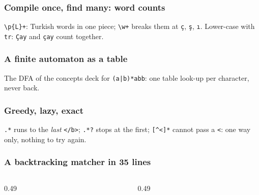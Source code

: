 \documentclass[aspectratio=169,10pt,compress]{beamer}
\begin{document}
\begin{frame}[t,fragile] \frametitle{Compile once, find many: word counts}

  \vspace{0.2em}
  \small \texttt{\textbackslash p\{L\}+}: Turkish words in one piece; \texttt{\textbackslash w+} breaks them at \texttt{ç}, \texttt{ş}, \texttt{ı}. Lower-case with \texttt{tr}: \texttt{Çay} and \texttt{çay} count together.
\end{frame}





\begin{frame}[t,fragile] \frametitle{A finite automaton as a table}

  \vspace{0.2em}
  \small The DFA of the concepts deck for \texttt{(a|b)*abb}: one table look-up per character, never back.
\end{frame}




\begin{frame}[t,fragile] \frametitle{Greedy, lazy, exact}

  \vspace{0.2em}
  \small \texttt{.*} runs to the \emph{last} \texttt{</b>}; \texttt{.*?} stops at the first; \texttt{[\textasciicircum <]*} cannot pass a \texttt{<}: one way only, nothing to try again.
\end{frame}




\begin{frame}[t,fragile] \frametitle{A backtracking matcher in 35 lines}
  \begin{columns}[T]
    \begin{column}{0.49\textwidth}
    \end{column}
    \begin{column}{0.49\textwidth}
    \end{column}
  \end{columns}
\end{frame}
\end{document}
